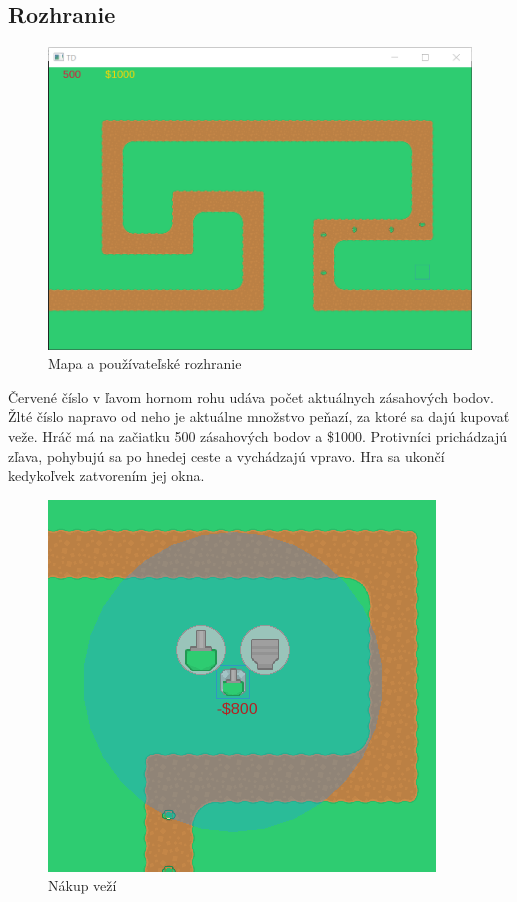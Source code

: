 \documentclass[12pt]{article}
\begin{document}
\subsection{Rozhranie}

\begin{figure}[h]
    \includegraphics{images/hra.png}
    \caption{Mapa a používateľské rozhranie}
\end{figure}

Červené číslo v ľavom hornom rohu udáva počet aktuálnych zásahových bodov.
Žlté číslo napravo od neho je aktuálne množstvo peňazí, za ktoré sa dajú kupovať veže.
Hráč má na začiatku 500 zásahových bodov a \$1000.
Protivníci prichádzajú zľava, pohybujú sa po hnedej ceste a vychádzajú vpravo.
Hra sa ukončí kedykoľvek zatvorením jej okna.

\begin{figure}[h]
    \centering
    \includegraphics{images/contextmenu.png}
    \caption{Nákup veží}
\end{figure}
\end{document}
